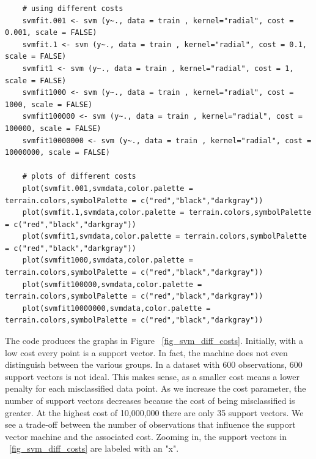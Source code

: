 \documentclass[12pt]{article}
\begin{document}
\begin{verbatim}
    # using different costs
    svmfit.001 <- svm (y~., data = train , kernel="radial", cost = 0.001, scale = FALSE)
    svmfit.1 <- svm (y~., data = train , kernel="radial", cost = 0.1, scale = FALSE)
    svmfit1 <- svm (y~., data = train , kernel="radial", cost = 1, scale = FALSE)
    svmfit1000 <- svm (y~., data = train , kernel="radial", cost = 1000, scale = FALSE)
    svmfit100000 <- svm (y~., data = train , kernel="radial", cost = 100000, scale = FALSE)
    svmfit10000000 <- svm (y~., data = train , kernel="radial", cost = 10000000, scale = FALSE)
    
    # plots of different costs
    plot(svmfit.001,svmdata,color.palette = terrain.colors,symbolPalette = c("red","black","darkgray"))
    plot(svmfit.1,svmdata,color.palette = terrain.colors,symbolPalette = c("red","black","darkgray"))
    plot(svmfit1,svmdata,color.palette = terrain.colors,symbolPalette = c("red","black","darkgray"))
    plot(svmfit1000,svmdata,color.palette = terrain.colors,symbolPalette = c("red","black","darkgray"))
    plot(svmfit100000,svmdata,color.palette = terrain.colors,symbolPalette = c("red","black","darkgray"))
    plot(svmfit10000000,svmdata,color.palette = terrain.colors,symbolPalette = c("red","black","darkgray"))
\end{verbatim}

The code produces the graphs in Figure ~\ref{fig_svm_diff_costs}. Initially, with a low cost every point is a support vector. In fact, the machine does not even distinguish between the various groups. In a dataset with 600 observations, 600 support vectors is not ideal. This makes sense, as a smaller cost means a lower penalty for each misclassified data point. As we increase the cost parameter, the number of support vectors decreases because the cost of being misclassified is greater. At the highest cost of 10,000,000 there are only 35 support vectors. We see a trade-off between the number of observations that influence the support vector machine and the associated cost. Zooming in, the support vectors in ~\ref{fig_svm_diff_costs} are labeled with an "x".
\end{document}
